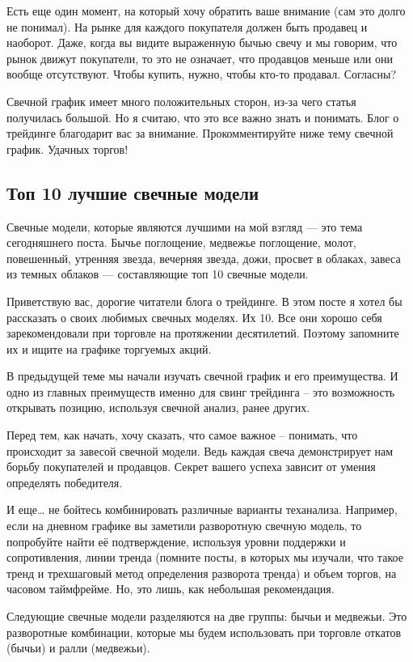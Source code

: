 \documentclass[a5paper]{article}
\begin{document}
Есть еще один момент, на который хочу обратить ваше внимание (сам это долго не понимал). На рынке для каждого покупателя должен быть продавец и наоборот. Даже, когда вы видите выраженную бычью свечу и мы говорим, что рынок движут покупатели, то это не означает, что продавцов меньше или они вообще отсутствуют. Чтобы купить, нужно, чтобы кто-то продавал. Согласны?

Свечной график имеет много положительных сторон, из-за чего статья получилась большой. Но я считаю, что это все важно знать и понимать. Блог о трейдинге благодарит вас за внимание. Прокомментируйте ниже тему свечной график. Удачных торгов!


\subsection{Топ 10 лучшие свечные модели}

Свечные модели, которые являются лучшими на мой взгляд — это тема сегодняшнего поста. Бычье поглощение, медвежье поглощение, молот, повешенный, утренняя звезда, вечерняя звезда, дожи, просвет в облаках, завеса из темных облаков — составляющие топ 10 свечные модели.

Приветствую вас, дорогие читатели блога о трейдинге. В этом посте я хотел бы рассказать о своих любимых свечных моделях. Их 10. Все они хорошо себя зарекомендовали при торговле на протяжении десятилетий. Поэтому запомните их и ищите на графике торгуемых акций.

В предыдущей теме мы начали изучать свечной график и его преимущества. И одно из главных преимуществ именно для свинг трейдинга – это возможность открывать позицию, используя свечной анализ, ранее других.

Перед тем, как начать, хочу сказать, что самое важное – понимать, что происходит за завесой свечной модели. Ведь каждая свеча демонстрирует нам борьбу покупателей и продавцов. Секрет вашего успеха зависит от умения определять победителя.

И еще… не бойтесь комбинировать различные варианты теханализа. Например, если на дневном графике вы заметили разворотную свечную модель, то попробуйте найти её подтверждение, используя уровни поддержки и сопротивления, линии тренда (помните посты, в которых мы изучали, что такое тренд и трехшаговый метод определения разворота тренда) и объем торгов, на часовом таймфрейме. Но, это лишь, как небольшая рекомендация.

Следующие свечные модели разделяются на две группы: бычьи и
медвежьи. Это разворотные комбинации, которые мы будем использовать
при торговле откатов (бычьи) и ралли (медвежьи).
\end{document}
